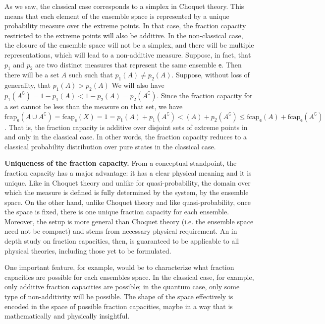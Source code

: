 \documentclass[10pt,twocolumn, nofootinbib]{revtex4-2}
\newcommand\frcap{\mathrm{fcap}}
\newcommand{\ens}[1][e] {\mathsf{#1}} %
\begin{document}
As we saw, the classical case corresponds to a simplex in Choquet theory. This means that each element of the ensemble space is represented by a unique probability measure over the extreme points. In that case, the fraction capacity restricted to the extreme points will also be additive. In the non-classical case, the closure of the ensemble space will not be a simplex, and there will be multiple representations, which will lead to a non-additive measure. Suppose, in fact, that $p_1$ and $p_2$ are two distinct measures that represent the same ensemble $\ens$. Then there will be a set $A$ such such that $p_1(A) \neq p_2(A)$. Suppose, without loss of generality, that $p_1(A) > p_2(A)$ We will also have $p_1(A^{\complement}) = 1- p_1(A) < 1 - p_2(A) = p_2(A^{\complement})$. Since the fraction capacity for a set cannot be less than the measure on that set, we have $\frcap_{\ens}(A \cup A^{\complement})=\frcap_{\ens}(X) = 1 = p_1(A) + p_1(A^{\complement}) < (A) + p_2(A^{\complement}) \leq \frcap_{\ens}(A) + \frcap_{\ens}(A^{\complement})$. That is, the fraction capacity is additive over disjoint sets of extreme points in and only in the classical case. In other words, the fraction capacity reduces to a classical probability distribution over pure states in the classical case.

\textbf{Uniqueness of the fraction capacity.} From a conceptual standpoint, the fraction capacity has a major advantage: it has a clear physical meaning and it is unique. Like in Choquet theory and unlike for quasi-probability, the domain over which the measure is defined is fully determined by the system, by the ensemble space. On the other hand, unlike Choquet theory and like quasi-probability, once the space is fixed, there is one unique fraction capacity for each ensemble. Moreover, the setup is more general than Choquet theory (i.e. the ensemble space need not be compact) and stems from necessary physical requirement. An in depth study on fraction capacities, then, is guaranteed to be applicable to all physical theories, including those yet to be formulated.

One important feature, for example, would be to characterize what fraction capacities are possible for each ensembles space. In the classical case, for example, only additive fraction capacities are possible; in the quantum case, only some type of non-additivity will be possible. The shape of the space effectively is encoded in the space of possible fraction capacities, maybe in a way that is mathematically and physically insightful.
\end{document}
